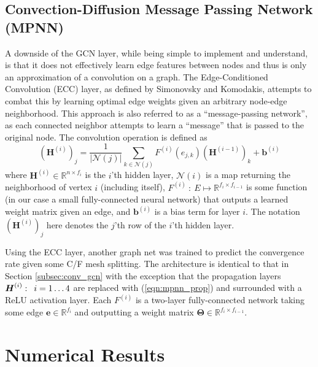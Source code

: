 \documentclass[review]{siamart190516}
\newcommand{\abs}[1]{\left\lvert#1\right\rvert}
\newcommand{\mat}[1]{\bm{{#1}}}
\renewcommand{\vec}[1]{\bm{{#1}}}
\newcommand{\hquad}{\enskip}
\begin{document}
\subsection{Convection-Diffusion Message Passing Network (MPNN)}\label{subsec:conv_mpnn}
A downside of the GCN layer, while being simple to implement and understand, is that it does not effectively learn edge features between nodes and thus is only an approximation of a convolution on a graph.  The Edge-Conditioned Convolution (ECC) layer, as defined by Simonovsky and Komodakis\cite{ecc}, attempts to combat this by learning optimal edge weights given an arbitrary node-edge neighborhood.  This approach is also referred to as a ``message-passing network'', as each connected neighbor attempts to learn a ``message'' that is passed to the original node\cite{mpnn}.  The convolution operation is defined as
%
\begin{equation}\label{eqn:mpnn_prop}
  \left(\mat{H}^{(i)}\right)_j = \frac{1}{\abs{\mathcal{N}\left(j\right)}} \sum_{k\in\mathcal{N}\left(j\right)} F^{(i)}\left(e_{j,k}\right)\left(\mat{H}^{(i-1)}\right)_k + \vec{b}^{(i)}
\end{equation}
%
where $\mat{H}^{\left(i\right)} \in \mathbb{R}^{n \times f_i}$ is the $i$'th hidden layer, $\mathcal{N}\left(i\right)$ is a map returning the neighborhood of vertex $i$ (including itself), $F^{(i)} \: : \: E \mapsto \mathbb{R}^{f_i \times f_{i-1}}$ is some function (in our case a small fully-connected neural network) that outputs a learned weight matrix given an edge, and $\vec{b}^{(i)}$ is a bias term for layer $i$.  The notation $\left(\mat{H}^{\left(i\right)}\right)_j$ here denotes the $j$'th row of the $i$'th hidden layer.

Using the ECC layer, another graph net was trained to predict the convergence rate given some C/F mesh splitting.  The architecture is identical to that in Section \ref{subsec:conv_gcn} with the exception that the propagation layers $\mat{H}^{(i)}: \hquad i=1\ldots 4$ are replaced with (\ref{eqn:mpnn_prop}) and surrounded with a ReLU activation layer.  Each $F^{(i)}$ is a two-layer fully-connected network taking some edge $\vec{e} \in \mathbb{R}^{f_i}$ and outputting a weight matrix $\mat{\Theta} \in \mathbb{R}^{f_i\times f_{i-1}}$.


\section{Numerical Results}\label{sec:num}
\end{document}
